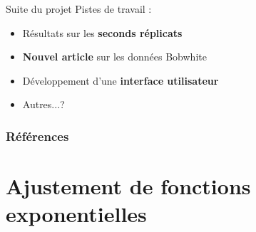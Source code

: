 \documentclass[10pt]{beamer}
\begin{document}
\begin{frame}{Suite du projet}
  Pistes de travail :
  \begin{itemize}
  \item Résultats sur les \textbf{seconds réplicats}
  \item \textbf{Nouvel article} sur les données Bobwhite
  \item Développement d'une \textbf{interface utilisateur}
  \item Autres...?
  \end{itemize}

\end{frame}


\appendix
{}


\begin{frame}[allowframebreaks]
  \frametitle{Références}
  
  \scriptsize{
    
  }
\end{frame}

\section{Ajustement de fonctions exponentielles}
  

\end{document}

